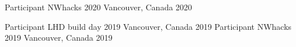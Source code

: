 




\begin{cvhonors}


\cvhonor
    {Participant} %
    {NWhacks 2020} %
    {Vancouver, Canada} %
    {2020} %

\cvhonor
    {Participant} %
    {LHD build day 2019} %
    {Vancouver, Canada} %
    {2019} %
  \cvhonor
    {Participant} %
    {NWhacks 2019} %
    {Vancouver, Canada} %
    {2019} %


\end{cvhonors}







